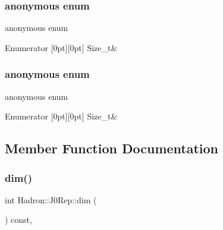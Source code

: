 \subsubsection{\texorpdfstring{anonymous enum}{anonymous enum}}
{\footnotesize\ttfamily anonymous enum}

\begin{DoxyEnumFields}{Enumerator}
[0pt][0pt]{}\mbox{\label{structHadron_1_1J0Rep_afc3e4decdde93ed9eb3764e7ee3d3e4da9fdf35798851a37205e81b7c3aa9ed49}} 
Size\+\_\+t&\\
\hline

\end{DoxyEnumFields}
\mbox{\label{structHadron_1_1J0Rep_afc3e4decdde93ed9eb3764e7ee3d3e4d}} 
\subsubsection{\texorpdfstring{anonymous enum}{anonymous enum}}
{\footnotesize\ttfamily anonymous enum}

\begin{DoxyEnumFields}{Enumerator}
[0pt][0pt]{}\mbox{\label{structHadron_1_1J0Rep_afc3e4decdde93ed9eb3764e7ee3d3e4da9fdf35798851a37205e81b7c3aa9ed49}} 
Size\+\_\+t&\\
\hline

\end{DoxyEnumFields}


\subsection{Member Function Documentation}
\mbox{\label{structHadron_1_1J0Rep_a99c9a3c8bac7e89e8f393fdd0cdd8c64}} 
\subsubsection{\texorpdfstring{dim()}{dim()}\hspace{0.1cm}{\footnotesize\ttfamily [1/3]}}
{\footnotesize\ttfamily int Hadron\+::\+J0\+Rep\+::dim (\begin{DoxyParamCaption}{ }\end{DoxyParamCaption}) const\hspace{0.3cm}{\ttfamily [inline]}, {\ttfamily [virtual]}}



